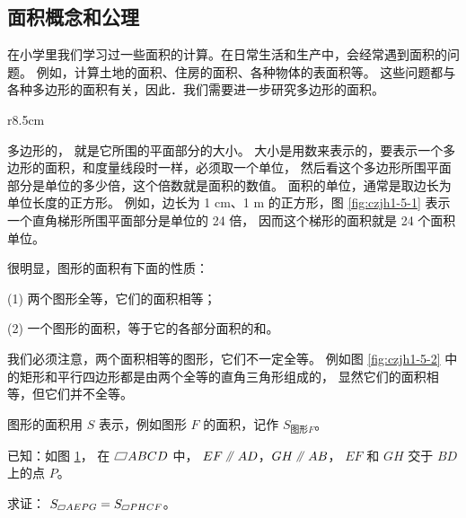 \subsection{面积概念和公理}\label{subsec:czjh1-5-1}

在小学里我们学习过一些面积的计算。在日常生活和生产中，会经常遇到面积的问题。
例如，计算土地的面积、住房的面积、各种物体的表面积等。
这些问题都与各种多边形的面积有关，因此．我们需要进一步研究多边形的面积。

\begin{wrapfigure}[8]{r}{8.5cm}
    \centering
    
    \caption{}\label{fig:czjh1-5-1}
\end{wrapfigure}

多边形的， 就是它所围的平面部分的大小。
大小是用数来表示的，要表示一个多边形的面积，和度量线段时一样，必须取一个单位，
然后看这个多边形所围平面部分是单位的多少倍，这个倍数就是面积的数值。
面积的单位，通常是取边长为单位长度的正方形。
例如，边长为 1 cm、1 m 的正方形，图 \ref{fig:czjh1-5-1} 表示一个直角梯形所围平面部分是单位的 24 倍，
因而这个梯形的面积就是 24 个面积单位。

很明显，图形的面积有下面的性质：

(1) 两个图形全等，它们的面积相等；

(2) 一个图形的面积，等于它的各部分面积的和。

我们必须注意，两个面积相等的图形，它们不一定全等。
例如图 \ref{fig:czjh1-5-2} 中的矩形和平行四边形都是由两个全等的直角三角形组成的，
显然它们的面积相等，但它们并不全等。

图形的面积用 $S$ 表示，例如图形 $F$ 的面积，记作 $S_{\text{图形}F}$。


\begin{figure}[htbp]
    \centering
    \begin{minipage}[b]{7cm}
        \centering
        
        \caption{}\label{fig:czjh1-5-2}
    \end{minipage}
    \qquad
    \begin{minipage}[b]{7cm}
        \centering
        
        \caption{}\label{fig:czjh1-5-3}
    \end{minipage}
\end{figure}


\liti[0] 已知：如图 \ref{fig:czjh1-5-3}， 在 $\pxsbx ABCD$ 中， $EF \pingxing AD$，$GH \pingxing AB$， $EF$ 和 $GH$ 交于 $BD$ 上的点 $P$。

求证： $S_{\pxsbx AEPG} = S_{\pxsbx PHCF}$。

